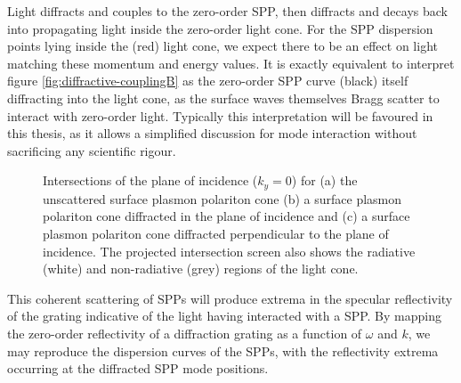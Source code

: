 Light diffracts and couples to the zero-order SPP, then diffracts and decays back into propagating light inside the zero-order light cone. For the SPP dispersion points lying inside the (red) light cone, we expect there to be an effect on light matching these momentum and energy values. It is exactly equivalent to interpret figure \ref{fig:diffractive-couplingB} as the zero-order SPP curve (black) itself diffracting into the light cone, as the surface waves themselves Bragg scatter to interact with zero-order light. Typically this interpretation will be favoured in this thesis, as it allows a simplified discussion for mode interaction without sacrificing any scientific rigour.

\begin{figure}
\begin{center}

\subfigure[]{\label{fig:plasmon-intersectionsA}}

\subfigure[]{\label{fig:plasmon-intersectionsB}}

\subfigure[]{\label{fig:plasmon-intersectionsC}}

	\caption[3D plots demonstrating intersections of the plane of incidence with a scattered SPP cone.]{Intersections of the plane of incidence ($k_y = 0$) for (a) the unscattered surface plasmon polariton cone (b) a surface plasmon polariton cone diffracted in the plane of incidence and (c) a surface plasmon polariton cone diffracted perpendicular to the plane of incidence.\label{fig:plasmon-intersections} The projected intersection screen also shows the radiative (white) and non-radiative (grey) regions of the light cone.}
	\end{center}
\end{figure}

This coherent scattering of SPPs will produce extrema in the specular reflectivity of the grating indicative of the light having interacted with a SPP.  By mapping the zero-order reflectivity of a diffraction grating as a function of $\omega$ and $k$, we may reproduce the dispersion curves of the SPPs, with the reflectivity extrema occurring at the diffracted SPP mode positions. 

